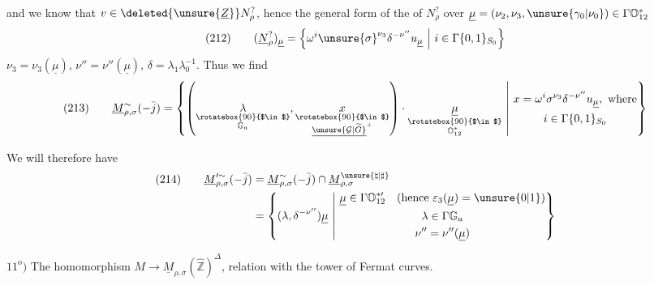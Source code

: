 and we know that $v\in\deleted{\unsure{\underline Z}}
N_\rho^{?}$, hence the general form
of the 
of $N_\rho^{?}$ over
$\underline\mu=(\nu_2,\nu_3,\unsure{\gamma_0|\nu_0})
\in\Gamma\mathbb O_{12}^{*}$
\[
(212)\qquad
(\underline N_\rho^{?})_{\underline\mu}
=\left\{\omega^{i}\unsure{\sigma}^{\nu_3}\delta^{-\nu''}
u_{\underline\mu}\ \middle|\
i\in\Gamma\{0,1\}_{S_0}\right\}
\]
$\nu_3=\nu_3(\underline\mu)$,
$\nu''=\nu''(\underline\mu)$,
$\delta=\lambda_1\lambda_0^{-1}$. Thus we find
\[
\begin{aligned}
(213)\qquad
\underline M_{\rho,\sigma}^{\sim}(-\bar j)
=\left\{\left(
\underset{\substack{\rotatebox{90}{$\in$}\\\mathbb G_a}}{\lambda},
\underset{\substack{\rotatebox{90}{$\in$}\\
\underline{\unsure{\mathcal G|\widetilde G}}^{+}}}{x}
\right)\cdot
\underset{\substack{\rotatebox{90}{$\in$}\\
\mathbb O_{12}^{*}}}{\underline\mu}
\ \middle|\
\begin{gathered}
x=\omega^{i}\sigma^{\nu_3}\delta^{-\nu''}u_{\underline\mu},\ \text{where}\\
i\in\Gamma\{0,1\}_{S_0}
\end{gathered}\right\}
\end{aligned}
\]

We will therefore have
\[
\begin{aligned}
(214)\qquad
\underline M_{\rho,\sigma}^{\prime\sim}(-\bar j)
&=\underline M_{\rho,\sigma}^{\sim}(-\bar j)\cap
\underline M_{\rho,\sigma}^{\unsure{\natural|\sharp}}\\
&=\left\{(\lambda,\delta^{-\nu''})\underline\mu
\ \middle|\
\begin{gathered}
\underline\mu\in\Gamma\mathbb O_{12}^{*\prime}
\quad(\text{hence }\varepsilon_3(\underline\mu)=\unsure{0|1})\\
\lambda\in\Gamma\mathbb G_a\\
\nu''=\nu''(\underline\mu)
\end{gathered}\right\}
\end{aligned}
\]

$11^{\mathrm o})$ The homomorphism
$M\longrightarrow\underline M_{\rho,\sigma}(\widehat{\mathbb Z})^{\Delta}$,
relation with the tower of Fermat curves.

